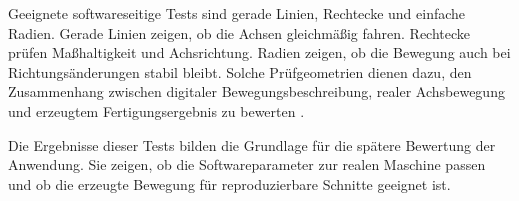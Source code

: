 Geeignete softwareseitige Tests sind gerade Linien, Rechtecke und einfache Radien. Gerade Linien zeigen, ob die Achsen gleichmäßig fahren. Rechtecke prüfen Maßhaltigkeit und Achsrichtung. Radien zeigen, ob die Bewegung auch bei Richtungsänderungen stabil bleibt. Solche Prüfgeometrien dienen dazu, den Zusammenhang zwischen digitaler Bewegungsbeschreibung, realer Achsbewegung und erzeugtem Fertigungsergebnis zu bewerten \cite{Fritz:2022}.

Die Ergebnisse dieser Tests bilden die Grundlage für die spätere Bewertung der Anwendung. Sie zeigen, ob die Softwareparameter zur realen Maschine passen und ob die erzeugte Bewegung für reproduzierbare Schnitte geeignet ist.

